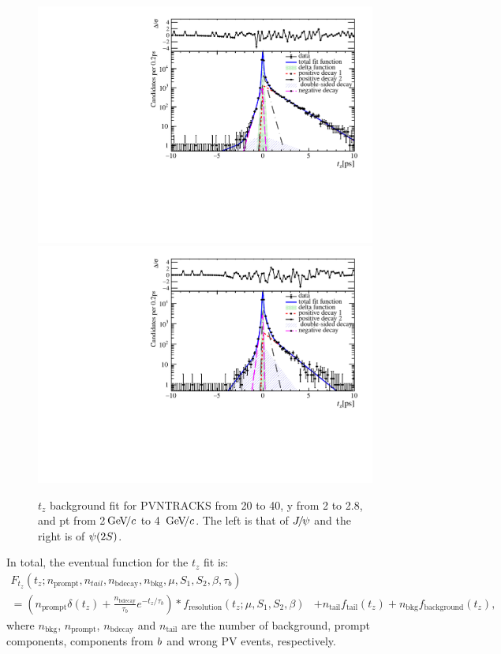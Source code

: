 \begin{figure}[!tbp]
   \begin{center}
     \includegraphics[width=0.49\linewidth]{pdf/Jpsi/Tzbkg/n2y1pt2}
     \includegraphics[width=0.49\linewidth]{pdf/Psi2S/Tzbkg/n2y1pt2}
     \vspace*{-0.5cm}
   \end{center}
   \caption{
     $t_z$ background fit for PVNTRACKS from 20 to 40, y from 2 to 2.8, and pt from 2$\text{\,Ge\kern -0.1em V\!/}c$ to 4 $\text{\,Ge\kern -0.1em V\!/}c$. The left is that of ${{J\mskip -3mu/\mskip -2mu\psi}}$ and the right is of ${\psi{(2S)}}$.
     }
   \label{fig:TzBKG}
 \end{figure}
In total, the eventual function for the $t_z$ fit is:
\begin{align}
F_{t_z}(t_z;n_{\mathrm{prompt}},n_{tail},n_{\mathrm{bdecay}},n_\mathrm{bkg},\mu,S_1,S_2,\beta,\tau_b)&   \nonumber \\
      =\left(n_{\mathrm{prompt}}\delta(t_z)+\frac{n_{\mathrm{bdecay}}}{\tau_b}e^{-t_z/\tau_b}\right)\ast f_\mathrm{resolution}(t_z;\mu,S_1,S_2,\beta)
      &+n_{\mathrm{tail}} f_\mathrm{tail}(t_z)+n_\mathrm{bkg}f_\mathrm{background}(t_z), \label{eq:FinalTz}
\end{align}
where $n_\mathrm{bkg}$, $n_{\mathrm{prompt}}$, $n_{\mathrm{bdecay}}$ and $n_{\mathrm{tail}}$ are the number of background, prompt components, components from ${b}$ and wrong PV events, respectively. 

